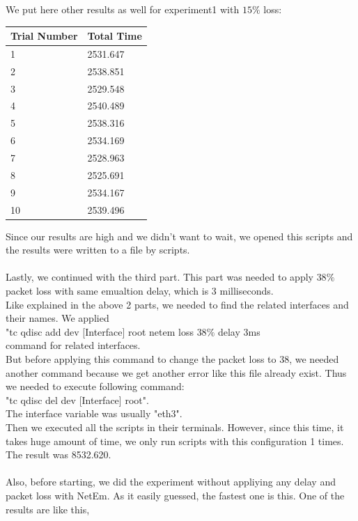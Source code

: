 \documentclass[conference]{IEEEtran}
\begin{document}
We put here other results as well for experiment1 with $15\%$ loss:
\\
\begin{table}[H]
\begin{tabular}{|l|l|}
\hline
Trial Number & Total Time \\ \hline
1            & 2531.647   \\ \hline
2            & 2538.851   \\ \hline
3            & 2529.548   \\ \hline
4            & 2540.489   \\ \hline
5            & 2538.316   \\ \hline
6            & 2534.169   \\ \hline
7            & 2528.963   \\ \hline
8            & 2525.691   \\ \hline
9            & 2534.167   \\ \hline
10           & 2539.496   \\ \hline
\end{tabular}
\end{table}

Since our results are high and we didn't want to wait, we opened this scripts and the results were written to a file by scripts.\\\\
Lastly, we continued with the third part. This part was needed to apply $38\%$ packet loss with same emualtion delay, which is 3 milliseconds.\\
Like explained in the above 2 parts, we needed to find the related interfaces and their names. We applied \\
"tc qdisc add dev [Interface] root netem loss $38\%$ delay 3ms \\ command for related interfaces.\\
But before applying this command to change the packet loss to 38, we needed another command because we get another error like this file already exist. Thus we needed to execute following command:\\
"tc qdisc del dev [Interface] root".\\
The interface variable was usually "eth3".\\
Then we executed all the scripts in their terminals. However, since this time, it takes huge amount of time, we only run scripts with this configuration 1 times. The result was 8532.620. \\\\
Also, before starting, we did the experiment without appliying any delay and packet loss with NetEm. As it easily guessed, the fastest one is this. One of the results are like this,
\end{document}

